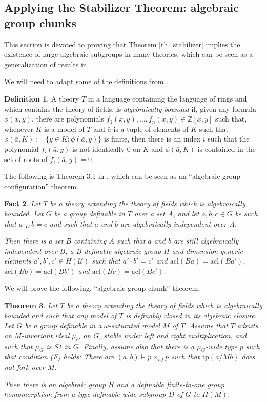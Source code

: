 \documentclass[12pt]{article}
\newtheorem{thm}{Theorem}[section]
\newtheorem{fait}[thm]{Fact}
\theoremstyle{definition}
\newtheorem{defi}[thm]{Definition}
\theoremstyle{mystyle}
\theoremstyle{remark}
\newcommand{\acl}{\mathrm{acl}}
\newcommand{\tp}{\mathrm{tp}}
\newcommand{\nf}{\times_{nf}}
\begin{document}
\subsection{Applying the Stabilizer Theorem: algebraic group chunks}

This section is devoted to proving that Theorem
\ref{th_stabilizer} implies the existence of large algebraic
subgroups in many theories, which can be seen as a generalization
of results in \cite{HrPi}

We will need to adapt some of the definitions from \cite{HrPi}.


\begin{defi}
A theory $T$ in a language containing the language of rings and
which contains the theory of fields, is \emph{algebraically
bounded} if, given any formula $\phi(\bar{x},y)$, there are
polynomials $f_1(\bar{x}, y),\ldots, f_n(\bar{x},y) \in
\mathbb{Z}[\bar{x},y]$ such that, whenever $K$ is a model of $T$
and $\bar{a}$ is a tuple of elements of $K$ such that
$\phi(\bar{a},K):= \{y \in K: \phi(\bar{a},y)\}$ is finite, then
there is an index $i$ such that the polynomial $f_i(\bar{a},y)$ is
not identically $0$ on $K$ and $\phi(\bar{a},K)$ is contained in
the set of roots of $f_{i}(\bar{a},y)= 0$.
\end{defi}

The following is Theorem 3.1 in \cite{HrPi}, which can be seen as
an ``algebraic group configuration'' theorem.


\begin{fait}\label{fact_groupconf_original}
Let $T$ be a theory extending the theory of fields
which is algebraically bounded. Let $G$ be a group definable in $T$
over a set $A$, and let $a,b,c\in G$ be such that $a\cdot_G b=c$ and such that
$a$ and $b$ are algebraically independent over $A$.

Then there is a set $B$ containing $A$ such that $a$ and $b$ are still algebraically independent
over $B$, a $B$-definable algebraic group
$H$ and dimension-generic elements $a', b', c'\in H(\mathcal{U})$
such that $a'\cdot b' = c'$ and $\acl(Ba)=\acl(Ba')$,
$\acl(Bb)=\acl(Bb')$ and $\acl(Bc)=\acl(Bc')$.
\end{fait}


We will prove the following, ``algebraic group chunk'' theorem.

\begin{thm}\label{algebraic group chunk}
Let $T$ be a theory extending the theory of fields
which is algebraically bounded and such that any model of $T$ is
definably closed in its algebraic closure. Let $G$ be a group
definable in a $\omega$-saturated model $M$ of $T$. Assume that
$T$ admits an $M$-invariant ideal $\mu_G$ on $G$, stable under
left and right multiplication, and such that $\mu_G$ is S1 in $G$.
Finally, assume also that there is a $\mu_G$-wide type $p$ such
that condition (F) holds: There are $(a,b)\models p \nf p$ such
that $\tp(a/Mb)$ does not fork over $M$.

Then there is an algebraic group $H$ and a definable finite-to-one
group homomorphism from a type-definable wide subgroup $D$ of $G$
to $H(M)$.
\end{thm}
\end{document}
